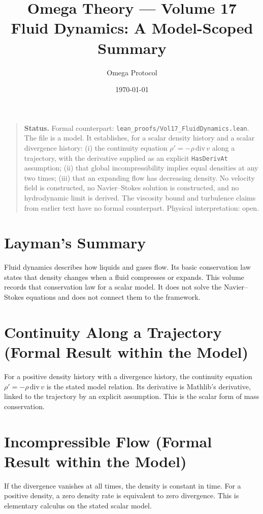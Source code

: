 \documentclass[11pt, a4paper]{article}
\title{Omega Theory --- Volume 17\\\Large Fluid Dynamics: A Model-Scoped Summary}
\author{Omega Protocol}
\date{\today}
\begin{document}
\maketitle

\begin{quote}
\textbf{Status.} Formal counterpart: \texttt{lean\_proofs/Vol17\_FluidDynamics.lean}. The file is a model. It establishes, for a scalar density history and a scalar divergence history: (i) the continuity equation $\rho' = -\rho\,\mathrm{div}\,v$ along a trajectory, with the derivative supplied as an explicit \texttt{HasDerivAt} assumption; (ii) that global incompressibility implies equal densities at any two times; (iii) that an expanding flow has decreasing density. No velocity field is constructed, no Navier--Stokes solution is constructed, and no hydrodynamic limit is derived. The viscosity bound and turbulence claims from earlier text have no formal counterpart. Physical interpretation: open.
\end{quote}

\section*{Layman's Summary}
Fluid dynamics describes how liquids and gases flow. Its basic conservation law states that density changes when a fluid compresses or expands. This volume records that conservation law for a scalar model. It does not solve the Navier--Stokes equations and does not connect them to the framework.

\section{Continuity Along a Trajectory (Formal Result within the Model)}
For a positive density history with a divergence history, the continuity equation $\rho' = -\rho\,\mathrm{div}\,v$ is the stated model relation. Its derivative is Mathlib's derivative, linked to the trajectory by an explicit assumption. This is the scalar form of mass conservation.

\section{Incompressible Flow (Formal Result within the Model)}
If the divergence vanishes at all times, the density is constant in time. For a positive density, a zero density rate is equivalent to zero divergence. This is elementary calculus on the stated scalar model.
\end{document}
